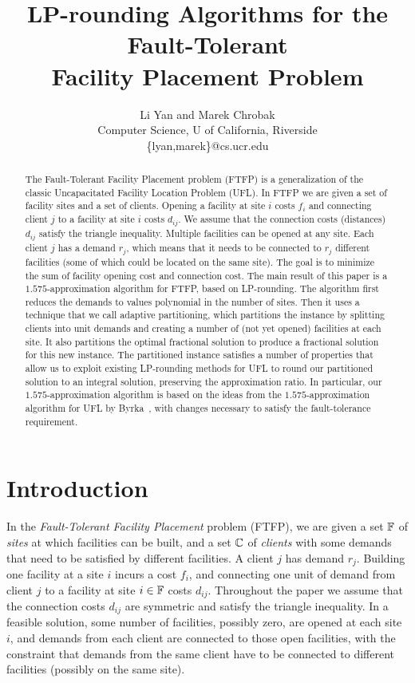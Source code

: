 \documentclass[11pt]{article}
\title{LP-rounding Algorithms for the Fault-Tolerant\\
 		Facility Placement Problem}
\author{Li Yan and Marek Chrobak\\
                Computer Science, U of California, Riverside\\
                \{lyan,marek\}@cs.ucr.edu\\
              }
\date{}
\begin{document}
\maketitle

\begin{abstract} 
  The Fault-Tolerant Facility Placement problem (FTFP) is a
  generalization of the classic Uncapacitated Facility Location
  Problem (UFL). In FTFP we are given a set of facility sites and a
  set of clients. Opening a facility at site $i$ costs $f_i$ and
  connecting client $j$ to a facility at site $i$ costs $d_{ij}$. We
  assume that the connection costs (distances) $d_{ij}$ satisfy the
  triangle inequality. Multiple facilities can be opened at any
  site. Each client $j$ has a demand $r_j$, which means that it needs
  to be connected to $r_j$ different facilities (some of which could
  be located on the same site). The goal is to minimize the sum of
  facility opening cost and connection cost. The main result of this
  paper is a $1.575$-approximation algorithm for FTFP, based on
  LP-rounding. The algorithm first reduces the demands to values
  polynomial in the number of sites. Then it uses a technique that we
  call adaptive partitioning, which partitions the instance by
  splitting clients into unit demands and creating a number of (not
  yet opened) facilities at each site. It also partitions the optimal
  fractional solution to produce a fractional solution for this new
  instance.  The partitioned instance satisfies a number of properties
  that allow us to exploit existing LP-rounding methods for UFL to
  round our partitioned solution to an integral solution, preserving
  the approximation ratio.  In particular, our $1.575$-approximation
  algorithm is based on the ideas from the $1.575$-approximation
  algorithm for UFL by Byrka~\etal, with changes necessary to satisfy
  the fault-tolerance requirement.
\end{abstract}

\section{Introduction}

In the \emph{Fault-Tolerant Facility Placement} problem
(FTFP), we are given a set $\mathbb{F}$ of \emph{sites} at
which facilities can be built, and a set $\mathbb{C}$ of
\emph{clients} with some demands that need to be satisfied
by different facilities. A client $j$ has demand
$r_j$. Building one facility at a site $i$ incurs a cost
$f_i$, and connecting one unit of demand from client $j$ to
a facility at site $i\in\mathbb{F}$ costs $d_{ij}$. Throughout the
paper we assume that the connection costs $d_{ij}$ are
symmetric and satisfy the triangle inequality. In a feasible solution, some
number of facilities, possibly zero, are opened at each site
$i$, and demands from each client are connected to those
open facilities, with the constraint that demands from the
same client have to be connected to different
facilities (possibly on the same site).
\end{document}
